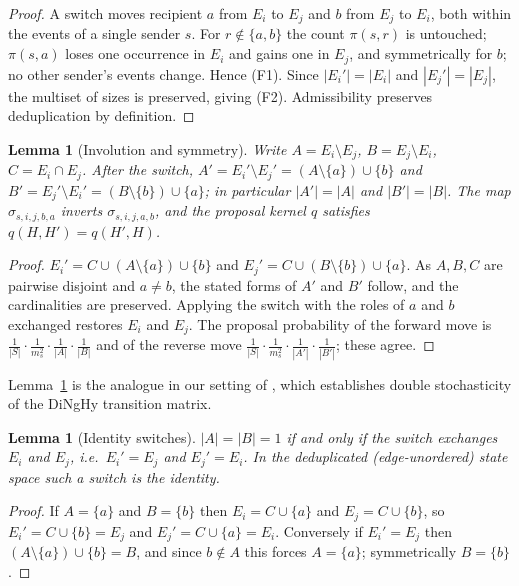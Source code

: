 \documentclass[11pt]{article}
\newtheorem{lemma}[theorem]{Lemma}
\theoremstyle{definition}
\begin{document}
\begin{proof}
A switch moves recipient $a$ from $E_i$ to $E_j$ and $b$ from $E_j$ to $E_i$,
both within the events of a single sender $s$. For $r\notin\{a,b\}$ the count
$\pi(s,r)$ is untouched; $\pi(s,a)$ loses one occurrence in $E_i$ and gains one
in $E_j$, and symmetrically for $b$; no other sender's events change. Hence (F1).
Since $|E_i'|=|E_i|$ and $|E_j'|=|E_j|$, the multiset of sizes is preserved,
giving (F2). Admissibility preserves deduplication by definition.
\end{proof}

\begin{lemma}[Involution and symmetry]\label{lem:sym}
Write $A=E_i\setminus E_j$, $B=E_j\setminus E_i$, $C=E_i\cap E_j$. After the
switch, $A'=E_i'\setminus E_j'=(A\setminus\{a\})\cup\{b\}$ and
$B'=E_j'\setminus E_i'=(B\setminus\{b\})\cup\{a\}$; in particular $|A'|=|A|$ and
$|B'|=|B|$. The map $\sigma_{s,i,j,b,a}$ inverts $\sigma_{s,i,j,a,b}$, and the
proposal kernel $q$ satisfies $q(H,H')=q(H',H)$.
\end{lemma}

\begin{proof}
$E_i'=C\cup(A\setminus\{a\})\cup\{b\}$ and $E_j'=C\cup(B\setminus\{b\})\cup\{a\}$.
As $A,B,C$ are pairwise disjoint and $a\neq b$, the stated forms of $A'$ and
$B'$ follow, and the cardinalities are preserved. Applying the switch with the
roles of $a$ and $b$ exchanged restores $E_i$ and $E_j$. The proposal
probability of the forward move is
$\frac{1}{|S|}\cdot\frac{1}{m_s^2}\cdot\frac{1}{|A|}\cdot\frac{1}{|B|}$
and of the reverse move
$\frac{1}{|S|}\cdot\frac{1}{m_s^2}\cdot\frac{1}{|A'|}\cdot\frac{1}{|B'|}$;
these agree.
\end{proof}

Lemma~\ref{lem:sym} is the analogue in our setting of \cite[Theorem~2]{dinghy},
which establishes double stochasticity of the DiNgHy transition matrix.

\begin{lemma}[Identity switches]\label{lem:id}
$|A|=|B|=1$ if and only if the switch exchanges $E_i$ and $E_j$, i.e.\
$E_i'=E_j$ and $E_j'=E_i$. In the deduplicated (edge-unordered) state space such
a switch is the identity.
\end{lemma}

\begin{proof}
If $A=\{a\}$ and $B=\{b\}$ then $E_i=C\cup\{a\}$ and $E_j=C\cup\{b\}$, so
$E_i'=C\cup\{b\}=E_j$ and $E_j'=C\cup\{a\}=E_i$. Conversely if $E_i'=E_j$ then
$(A\setminus\{a\})\cup\{b\}=B$, and since $b\notin A$ this forces $A=\{a\}$;
symmetrically $B=\{b\}$.
\end{proof}
\end{document}
